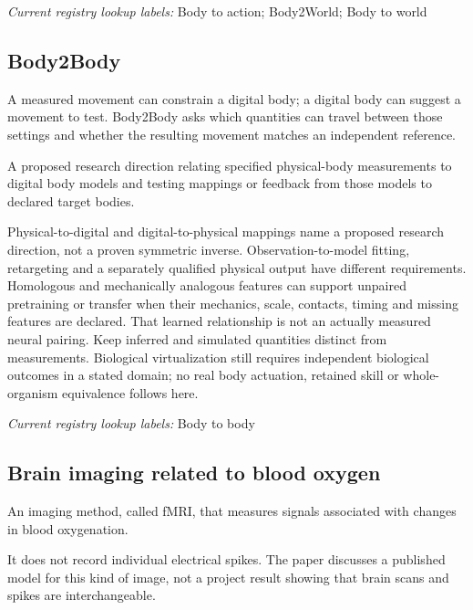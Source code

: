 \noindent\textit{Current registry lookup labels:} Body to action; Body2World; Body to world\par

\subsection*{Body2Body}
\noindent A measured movement can constrain a digital body; a digital body can suggest a movement to test. Body2Body asks which quantities can travel between those settings and whether the resulting movement matches an independent reference.\par
\noindent A proposed research direction relating specified physical-body measurements to digital body models and testing mappings or feedback from those models to declared target bodies.\par
\begin{samepage}
\noindent Physical-to-digital and digital-to-physical mappings name a proposed research direction, not a proven symmetric inverse. Observation-to-model fitting, retargeting and a separately qualified physical output have different requirements. Homologous and mechanically analogous features can support unpaired pretraining or transfer when their mechanics, scale, contacts, timing and missing features are declared. That learned relationship is not an actually measured neural pairing. Keep inferred and simulated quantities distinct from measurements. Biological virtualization still requires independent biological outcomes in a stated domain; no real body actuation, retained skill or whole-organism equivalence follows here.\par\nopagebreak[4]

\end{samepage}


\noindent\textit{Current registry lookup labels:} Body to body\par

\begin{samepage}
\subsection*{Brain imaging related to blood oxygen}
\noindent An imaging method, called fMRI, that measures signals associated with changes in blood oxygenation.\par
\end{samepage}
\begin{samepage}
\noindent It does not record individual electrical spikes. The paper discusses a published model for this kind of image, not a project result showing that brain scans and spikes are interchangeable.\par\nopagebreak[4]

\end{samepage}


